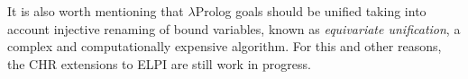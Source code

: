 \documentclass[preprint]{sigplanconf}
\begin{document}
It is also worth mentioning that $\lambda$Prolog goals should be unified taking
into account injective renaming of bound variables, known as \emph{equivariate
unification}, a complex and computationally expensive algorithm.
For this and other reasons, the CHR extensions to ELPI are still work in progress.
% 
% 
% 
% 
% 
% 
% 
% 
% 
\end{document}
